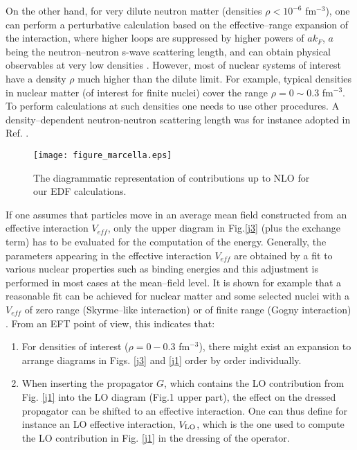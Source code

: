 \documentclass[aps,11pt,prc,preprint,superscriptaddress,nofootinbib]{revtex4}
\begin{document}
On the other hand,
for very dilute neutron matter (densities $\rho < 10^{-6}$ fm$^{-3}$), one
can perform a perturbative calculation based on the effective--range
expansion of the interaction, where higher loops are suppressed by higher
powers of $ak_{F}$, $a$ being the neutron--neutron s-wave scattering length, and can obtain physical
observables at very low densities \cite{lee,hammer,hammerlucas,Fur12,pug,fur,bishop}. However,
most of nuclear systems of interest have a density $\rho $ much higher than the dilute
limit. For example, typical densities in nuclear matter (of interest for finite nuclei) cover
the range  $%
\rho =0\sim 0.3$ fm$^{-3}$. To perform calculations at such densities one needs
to use other procedures. A density--dependent neutron-neutron scattering length was for instance 
adopted in Ref. \cite{gra2017}. 


\begin{figure}[h]
\texttt{[image: figure\_marcella.eps]}
\caption{The diagrammatic representation of contributions up to NLO for our EDF calculations.}
\label{fignlo}
\end{figure}

If one assumes that particles move in an average
mean field constructed from an effective interaction $V_{eff}$, only the upper diagram in Fig.\ref{j3} (plus the exchange term) has to 
be evaluated for the computation of the energy. 
Generally, the parameters appearing in the effective interaction $V_{eff}$ are obtained by a fit to
various nuclear properties such as binding energies and this adjustment is performed in most cases at the mean--field level. It is shown for example that a
reasonable fit can be achieved for nuclear matter and some selected nuclei 
 with a $V_{eff}$ of zero range (Skyrme--like interaction) 
or of finite range (Gogny interaction) \cite{gogny1,gogny2}. From an EFT point of view,
this indicates that:

\begin{enumerate}
\item For densities of interest ($\rho =0-0.3$ fm$^{-3}$), there might
exist an expansion to arrange diagrams in Figs. \ref{j3} and \ref{j1} order by
order individually.

\item When inserting the propagator $G$, which contains the LO contribution from Fig. \ref{j1}
into the LO diagram (Fig.1 upper part), the effect on the dressed propagator can be shifted to an
effective interaction. One can thus define for instance an LO effective interaction, $V_{\rm LO}$, which is the one used to compute the LO contribution in Fig. \ref{j1} in the dressing of the operator.  
\end{enumerate}
\end{document}
